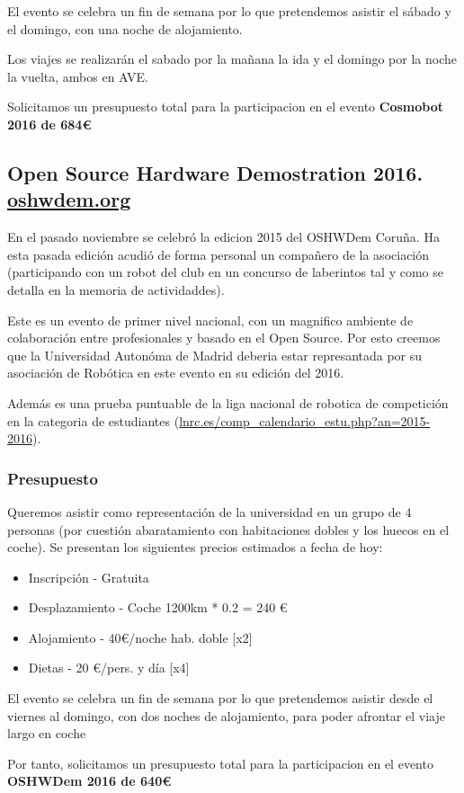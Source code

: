 \documentclass[12pt,twoside]{report}
\begin{document}
El evento se celebra un fin de semana por lo que pretendemos asistir el sábado y el domingo, con una noche de alojamiento.

Los viajes se realizarán el sabado por la mañana la ida y el domingo por la noche la vuelta, ambos en AVE.

Solicitamos un presupuesto total para la participacion en el evento {\bf Cosmobot 2016 de 684\euro{}}

\subsection{Open Source Hardware Demostration 2016. \url{oshwdem.org}}
En el pasado noviembre se celebró la edicion 2015 del OSHWDem Coruña. Ha esta pasada edición acudió de forma personal un compañero de la asociación (participando con un robot del club en un concurso de laberintos tal y como se detalla en la memoria de actividaddes).

Este es un evento de primer nivel nacional, con un magnifico ambiente de colaboración entre profesionales y basado en el Open Source. Por esto creemos que la Universidad Autonóma de Madrid deberia estar represantada por su asociación de Robótica en este evento en su edición del 2016.

Además es una prueba puntuable de la liga nacional de robotica de competición en la categoria de estudiantes (\url{lnrc.es/comp_calendario_estu.php?an=2015-2016}).

\subsubsection{Presupuesto}
Queremos asistir como representación de la universidad en un grupo de 4 personas (por cuestión abaratamiento con habitaciones dobles y los huecos en el coche). Se presentan los siguientes precios estimados a fecha de hoy:
\begin{itemize}
\item Inscripción - Gratuita
\item Desplazamiento - Coche 1200km * 0.2 = 240 \euro{}
\item Alojamiento - 40\euro{}/noche hab. doble [x2]
\item Dietas - 20 \euro{}/pers. y día [x4]
\end{itemize}
El evento se celebra un fin de semana por lo que pretendemos asistir desde el viernes al domingo, con dos noches de alojamiento, para poder afrontar el viaje largo en coche

Por tanto, solicitamos un presupuesto total para la participacion en el evento {\bf OSHWDem 2016 de 640\euro{}}
\end{document}
